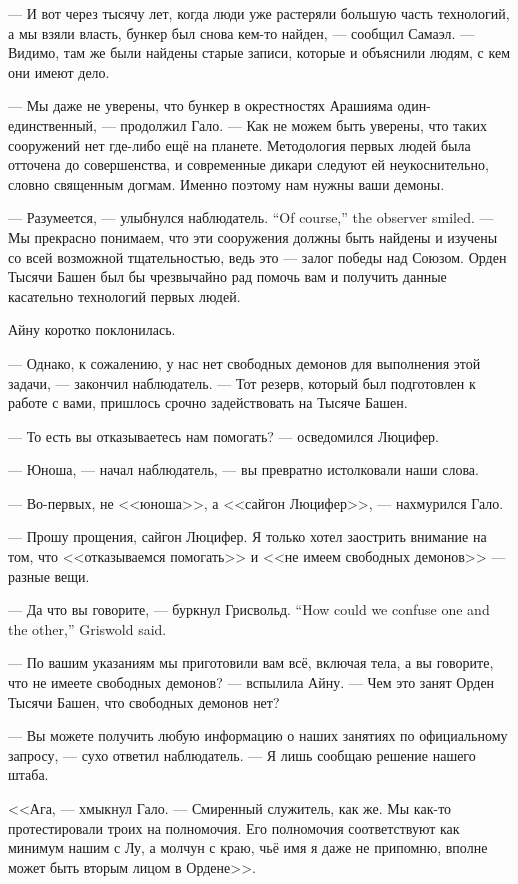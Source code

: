--- И вот через тысячу лет, когда люди уже растеряли большую часть технологий, а мы взяли власть, бункер был снова кем-то найден, --- сообщил Самаэл.
--- Видимо, там же были найдены старые записи, которые и объяснили людям, с кем они имеют дело.

--- Мы даже не уверены, что бункер в окрестностях Арашияма один-единственный, --- продолжил Гало.
--- Как не можем быть уверены, что таких сооружений нет где-либо ещё на планете.
Методология первых людей была отточена до совершенства, и современные дикари следуют ей неукоснительно, словно священным догмам.
Именно поэтому нам нужны ваши демоны.

{--- Разумеется, --- улыбнулся наблюдатель.}
{``Of course,'' the observer smiled.}
--- Мы прекрасно понимаем, что эти сооружения должны быть найдены и изучены со всей возможной тщательностью, ведь это --- залог победы над Союзом.
Орден Тысячи Башен был бы чрезвычайно рад помочь вам и получить данные касательно технологий первых людей.

Айну коротко поклонилась.

--- Однако, к сожалению, у нас нет свободных демонов для выполнения этой задачи, --- закончил наблюдатель.
--- Тот резерв, который был подготовлен к работе с вами, пришлось срочно задействовать на Тысяче Башен.

--- То есть вы отказываетесь нам помогать? --- осведомился Люцифер.

--- Юноша, --- начал наблюдатель, --- вы превратно истолковали наши слова.

--- Во-первых, не <<юноша>>, а <<сайгон Люцифер>>, --- нахмурился Гало.

--- Прошу прощения, сайгон Люцифер.
Я только хотел заострить внимание на том, что <<отказываемся помогать>> и <<не имеем свободных демонов>> --- разные вещи.

{--- Да что вы говорите, --- буркнул Грисвольд.}
{``How could we confuse one and the other,'' Griswold said.}

--- По вашим указаниям мы приготовили вам всё, включая тела, а вы говорите, что не имеете свободных демонов? --- вспылила Айну.
--- Чем это занят Орден Тысячи Башен, что свободных демонов нет?

--- Вы можете получить любую информацию о наших занятиях по официальному запросу, --- сухо ответил наблюдатель.
--- Я лишь сообщаю решение нашего штаба.

<<Ага, --- хмыкнул Гало.
--- Смиренный служитель, как же.
Мы как-то протестировали троих на полномочия.
Его полномочия соответствуют как минимум нашим с Лу, а молчун с краю, чьё имя я даже не припомню, вполне может быть вторым лицом в Ордене>>.

